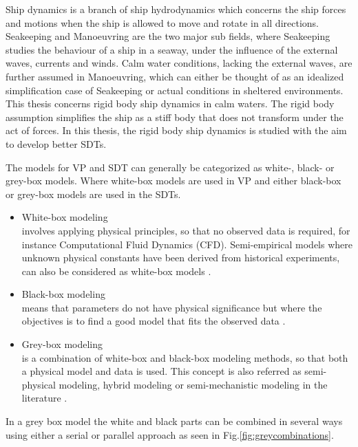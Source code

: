 Ship dynamics is a branch of ship hydrodynamics which concerns the ship forces and motions when the ship is allowed to move and rotate in all directions. Seakeeping and Manoeuvring are the two major sub fields, where Seakeeping studies the  behaviour of a ship in a seaway, under the influence of the external waves, currents and winds. Calm water conditions, lacking the external waves, are further assumed in Manoeuvring, which can either be thought of as an idealized simplification case of Seakeeping or actual conditions in sheltered environments. This thesis concerns rigid body ship dynamics in calm waters. The rigid body assumption simplifies the ship as a stiff body that does not transform under the act of forces. In this thesis, the rigid body ship dynamics is studied with the aim to develop better SDTs.

The models for VP and SDT can generally be categorized as white-, black- or grey-box models. Where 
white-box models are used in VP and either black-box or grey-box models are used in the SDTs. 
\begin{itemize}
    \item White-box modeling \\
    involves applying physical principles, so that no observed data is required, for instance Computational Fluid Dynamics (CFD). Semi-empirical models where unknown physical constants have been derived from historical experiments, can also be considered as white-box models \cite{leifsson_grey-box_2008}.  

    \item Black-box modeling \\
    means that parameters do not have physical significance but where the objectives is to find a good model that fits the observed data \cite{lindskog_tools_1995}.
    
    \item Grey-box modeling \\
    is a combination of white-box and black-box modeling methods, so that both a physical model and data is used. This concept is also referred as semi-physical modeling, hybrid modeling or semi-mechanistic modeling in the literature \cite{leifsson_grey-box_2008}. 
\end{itemize}

\noindent In a grey box model the white and black parts can be combined in several ways using either a serial or parallel approach \cite{leifsson_grey-box_2008} as seen in Fig.\ref{fig:greycombinations}. 


